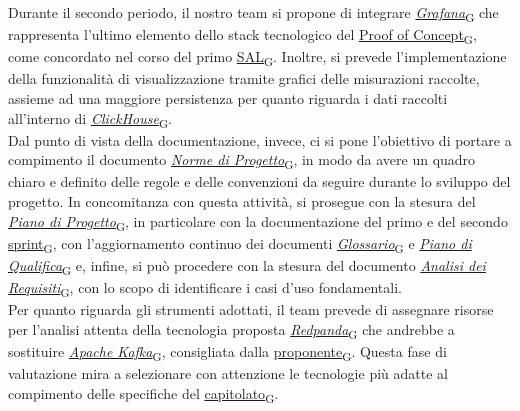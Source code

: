 Durante il secondo periodo, il nostro team si propone di integrare \href{https://7last.github.io/docs/rtb/documentazione-interna/glossario\#grafana}{\textit{Grafana}\textsubscript{G}} che rappresenta l'ultimo elemento dello stack tecnologico del \href{https://7last.github.io/docs/rtb/documentazione-interna/glossario\#proof-of-concept}{Proof of Concept\textsubscript{G}}, come concordato nel corso del primo \href{https://7last.github.io/docs/rtb/documentazione-interna/glossario\#stato-avanzamento-lavori}{SAL\textsubscript{G}}. Inoltre, si prevede l'implementazione della funzionalità di visualizzazione tramite grafici delle misurazioni raccolte,
assieme ad una maggiore persistenza per quanto riguarda i dati raccolti all'interno di \href{https://7last.github.io/docs/rtb/documentazione-interna/glossario\#clickhouse}{\textit{ClickHouse}\textsubscript{G}}. \\
Dal punto di vista della documentazione, invece, ci si pone l'obiettivo di portare a compimento il documento \href{https://7last.github.io/docs/rtb/documentazione-interna/glossario\#norme-di-progetto}{\textit{Norme di Progetto}\textsubscript{G}}, in modo da avere un quadro chiaro e definito delle regole e delle convenzioni da seguire durante lo sviluppo del progetto. In concomitanza con questa attività, si prosegue con la stesura del \href{https://7last.github.io/docs/rtb/documentazione-interna/glossario\#piano-di-progetto}{\textit{Piano di Progetto}\textsubscript{G}}, in particolare con la documentazione del primo e del secondo \href{https://7last.github.io/docs/rtb/documentazione-interna/glossario\#sprint}{sprint\textsubscript{G}}, con l'aggiornamento continuo dei documenti \href{https://7last.github.io/docs/rtb/documentazione-interna/glossario\#glossario}{\textit{Glossario}\textsubscript{G}} e \href{https://7last.github.io/docs/rtb/documentazione-interna/glossario\#piano-di-qualifica}{\textit{Piano di Qualifica}\textsubscript{G}} e, infine, si può procedere con la stesura del documento \href{https://7last.github.io/docs/rtb/documentazione-interna/glossario\#analisi-dei-requisiti}{\textit{Analisi dei Requisiti}\textsubscript{G}}, con lo scopo di identificare i casi d'uso fondamentali. \\
Per quanto riguarda gli strumenti adottati, il team prevede di assegnare risorse per l'analisi attenta della tecnologia proposta \href{https://7last.github.io/docs/rtb/documentazione-interna/glossario\#redpanda}{\textit{Redpanda}\textsubscript{G}} che andrebbe a sostituire \href{https://7last.github.io/docs/rtb/documentazione-interna/glossario\#apache-kafka}{\textit{Apache Kafka}\textsubscript{G}}, consigliata dalla \href{https://7last.github.io/docs/rtb/documentazione-interna/glossario\#proponente}{proponente\textsubscript{G}}. Questa fase di valutazione mira a selezionare con attenzione le tecnologie più adatte al compimento delle specifiche del \href{https://7last.github.io/docs/rtb/documentazione-interna/glossario\#capitolato}{capitolato\textsubscript{G}}.


